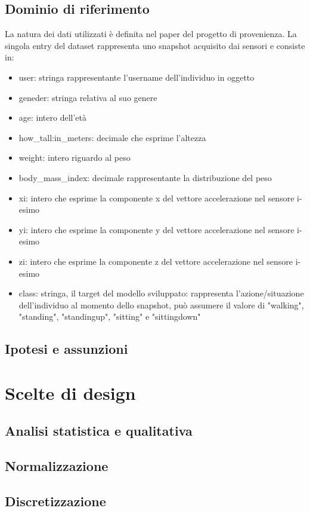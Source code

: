 \documentclass[12pt]{article}
\begin{document}
\subsection{Dominio di riferimento}
La natura dei dati utilizzati è definita nel paper\cite{Paper} del progetto di provenienza. La singola entry del dataset rappresenta uno snapshot acquisito dai sensori e consiste in:
\begin{itemize}
	\item user: stringa rappresentante l'username dell'individuo in oggetto
	\item geneder: stringa relativa al suo genere
	\item age: intero dell'età
	\item how\_tall:in\_meters: decimale che esprime l'altezza
	\item weight: intero riguardo al peso
	\item body\_mass\_index: decimale rappresentante la distribuzione del peso
	\item xi: intero che esprime la componente x del vettore accelerazione nel sensore i-esimo
	\item yi: intero che esprime la componente y del vettore accelerazione nel sensore i-esimo
	\item zi: intero che esprime la componente z del vettore accelerazione nel sensore i-esimo
	\item class: stringa, il target del modello sviluppato: rappresenta l'azione/situazione dell'individuo al momento dello snapshot, può assumere il valore di "walking", "standing", "standingup", "sitting" e "sittingdown"
\end{itemize}


\subsection{Ipotesi e assunzioni}

\section{Scelte di design}
\subsection{Analisi statistica e qualitativa}
\subsection{Normalizzazione}
\subsection{Discretizzazione}
\end{document}
